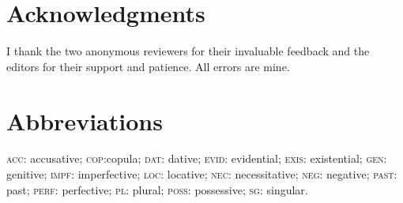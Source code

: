 \documentclass[output=paper]{langsci/langscibook}
\begin{document}
\section*{Acknowledgments}

I thank the two anonymous reviewers for their invaluable feedback and the editors for their support and patience. 
All errors are mine.

\section*{Abbreviations}

\textsc{acc}: accusative; 
\textsc{cop}:copula; 
\textsc{dat}: dative; 
\textsc{evid}: evidential; 
\textsc{exis}: existential;
\textsc{gen}: genitive; 
\textsc{impf}: imperfective; 
\textsc{loc}: locative; 
\textsc{nec}: necessitative; 
\textsc{neg}: negative; 
\textsc{past}: past; 
\textsc{perf}: perfective; 
\textsc{pl}: plural; 
\textsc{poss}: possessive; 
\textsc{sg}: singular.

\sloppy\printbibliography[heading=subbibliography,notkeyword=this]
\end{document}
